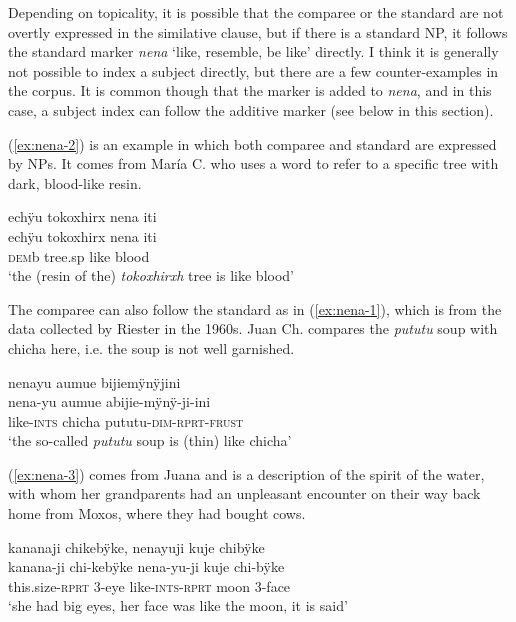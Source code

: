 Depending on topicality, it is possible that the comparee or the standard are not overtly expressed in the similative clause, but if there is a standard NP, it follows the standard marker \textit{nena} ‘like, resemble, be like’ directly. I think it is generally not possible to index a subject directly, but there are a few counter-examples in the corpus. It is common though that the  marker is added to \textit{nena}, and in this case, a subject index can follow the additive marker (see below in this section).

(\ref{ex:nena-2}) is an example in which both comparee and standard are expressed by NPs. It comes from María C. who uses a  word to refer to a specific tree with dark, blood-like resin.

\ea\label{ex:nena-2}
\begingl 
\glpreamble echÿu tokoxhirx nena iti\\
\gla echÿu tokoxhirx nena iti\\ 
\glb \textsc{dem}b tree.sp like blood\\ 
\glft ‘the (resin of the) \textit{tokoxhirxh} tree is like blood’\\ 
\endgl
\trailingcitation{[ump-p110815sf.366]}
\xe

The comparee can also follow the standard as in (\ref{ex:nena-1}), which is from the data collected by Riester in the 1960s. Juan Ch. compares the \textit{pututu} soup with chicha here, i.e. the soup is not well garnished.

\ea\label{ex:nena-1}
\begingl 
\glpreamble nenayu aumue bijiemÿnÿjini\\
\gla nena-yu aumue abijie-mÿnÿ-ji-ini\\ 
\glb like-\textsc{ints} chicha pututu-\textsc{dim}-\textsc{rprt}-\textsc{frust}\\ 
\glft ‘the so-called \textit{pututu} soup is (thin) like chicha’\\ 
\endgl
\trailingcitation{[nxx-p630101g-2.58]}
\xe

(\ref{ex:nena-3}) comes from Juana and is a description of the spirit of the water, with whom her grandparents had an unpleasant encounter on their way back home from Moxos, where they had bought cows.

\ea\label{ex:nena-3}
\begingl
\glpreamble kananaji chikebÿke, nenayuji kuje chibÿke\\
\gla kanana-ji chi-kebÿke nena-yu-ji kuje chi-bÿke\\
\glb this.size-\textsc{rprt} 3-eye like-\textsc{ints}-\textsc{rprt} moon 3-face\\
\glft ‘she had big eyes, her face was like the moon, it is said’
\endgl
\trailingcitation{[jxx-p151016l-2.091]}
\xe

